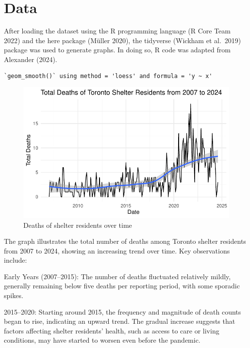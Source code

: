 \documentclass[
  letterpaper,
  DIV=11,
  numbers=noendperiod]{scrartcl}
\begin{document}
\hypertarget{data}{%
\section{Data}\label{data}}

After loading the dataset using the R programming language (R Core Team
2022) and the here package (Müller 2020), the tidyverse (Wickham et
al.~2019) package was used to generate graphs. In doing so, R code was
adapted from Alexander (2024).

\begin{verbatim}
`geom_smooth()` using method = 'loess' and formula = 'y ~ x'
\end{verbatim}

\begin{figure}

{\centering \includegraphics{paper_files/figure-pdf/fig-deaths-1.pdf}

}

\caption{\label{fig-deaths}Deaths of shelter residents over time}

\end{figure}

The graph illustrates the total number of deaths among Toronto shelter
residents from 2007 to 2024, showing an increasing trend over time. Key
observations include:

Early Years (2007--2015): The number of deaths fluctuated relatively
mildly, generally remaining below five deaths per reporting period, with
some sporadic spikes.

2015--2020: Starting around 2015, the frequency and magnitude of death
counts began to rise, indicating an upward trend. The gradual increase
suggests that factors affecting shelter residents' health, such as
access to care or living conditions, may have started to worsen even
before the pandemic.
\end{document}
